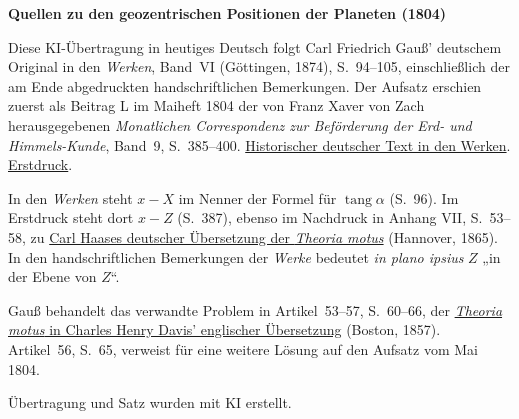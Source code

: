 \clearpage\thispagestyle{empty}
\begin{center}\textbf{Quellen zu den geozentrischen Positionen der Planeten (1804)}\end{center}
\noindent Diese KI-Übertragung in heutiges Deutsch folgt Carl Friedrich Gauß’ deutschem Original in den \textit{Werken}, Band~VI (Göttingen, 1874), S.~94--105, einschließlich der am Ende abgedruckten handschriftlichen Bemerkungen. Der Aufsatz erschien zuerst als Beitrag L im Maiheft 1804 der von Franz Xaver von Zach herausgegebenen \textit{Monatlichen Correspondenz zur Beförderung der Erd- und Himmels-Kunde}, Band~9, S.~385--400. \href{https://gdz.sub.uni-goettingen.de/id/PPN236007467}{Historischer deutscher Text in den Werken}. \href{https://www.digitale-sammlungen.de/en/view/bsb10538601?page=421}{Erstdruck}.
\par\smallskip\noindent In den \textit{Werken} steht \(x-X\) im Nenner der Formel für \(\operatorname{tang}\alpha\) (S.~96). Im Erstdruck steht dort \(x-Z\) (S.~387), ebenso im Nachdruck in Anhang VII, S.~53--58, zu \href{https://gdz.sub.uni-goettingen.de/id/PPN60187157X}{Carl Haases deutscher Übersetzung der \textit{Theoria motus}} (Hannover, 1865). In den handschriftlichen Bemerkungen der \textit{Werke} bedeutet \textit{in plano ipsius} \(Z\) „in der Ebene von \(Z\)“.
\par\smallskip\noindent Gauß behandelt das verwandte Problem in Artikel~53--57, S.~60--66, der \href{https://www2.karlin.mff.cuni.cz/~tuma/Aplikace21/theoryofmotionof00gausuoft.pdf#page=89}{\textit{Theoria motus} in Charles Henry Davis’ englischer Übersetzung} (Boston, 1857). Artikel~56, S.~65, verweist für eine weitere Lösung auf den Aufsatz vom Mai 1804.
\par\smallskip\noindent Übertragung und Satz wurden mit KI erstellt.
\clearpage
